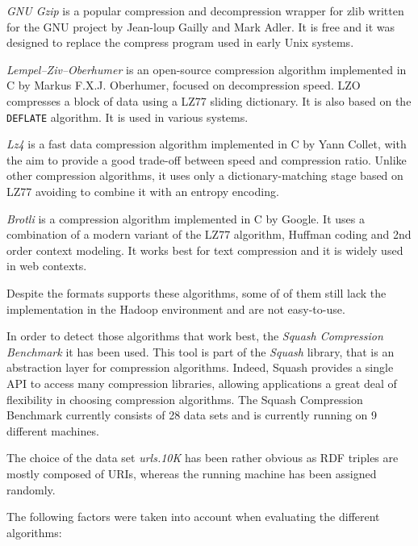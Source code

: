 \documentclass[10pt, a4paper]{report}
\begin{document}
\textit{GNU Gzip}\cite{gnu_gzip} is a popular compression and decompression wrapper for zlib written for the GNU project\cite{gnu_project} by Jean-loup Gailly and Mark Adler. It is free and it was designed to replace the compress program used in early Unix systems.

\textit{Lempel–Ziv–Oberhumer}\cite{lzo} is an open-source compression algorithm implemented in C by Markus F.X.J. Oberhumer, focused on decompression speed. LZO compresses a block of data using a LZ77 sliding dictionary. It is also based on the \texttt{DEFLATE} algorithm. It is used in various systems.

\textit{Lz4}\cite{lz4} is a fast data compression algorithm implemented in C by Yann Collet, with the aim to provide a good trade-off between speed and compression ratio. Unlike other compression algorithms, it uses only a dictionary-matching stage based on LZ77 avoiding to combine it with an entropy encoding.

\textit{Brotli}\cite{google_brotli} is a compression algorithm implemented in C by Google. It uses a combination of a modern variant of the LZ77 algorithm, Huffman coding and 2nd order context modeling. It works best for text compression and it is widely used in web contexts.

Despite the formats supports these algorithms, some of of them still lack the implementation in the Hadoop environment and are not easy-to-use.

In order to detect those algorithms that work best, the \textit{Squash Compression Benchmark}\cite{squash_compression_benchmark} it has been used. This tool is part of the \textit{Squash} library, that is an abstraction layer for compression algorithms. Indeed, Squash provides a single API to access many compression libraries, allowing applications a great deal of flexibility in choosing compression algorithms. The Squash Compression Benchmark currently consists of 28 data sets and is currently running on 9 different machines.

The choice of the data set \textit{urls.10K}\cite{urls_dataset} has been rather obvious as RDF triples are mostly composed of URIs, whereas the running machine has been assigned randomly.

The following factors were taken into account when evaluating the different algorithms: \\
\end{document}
